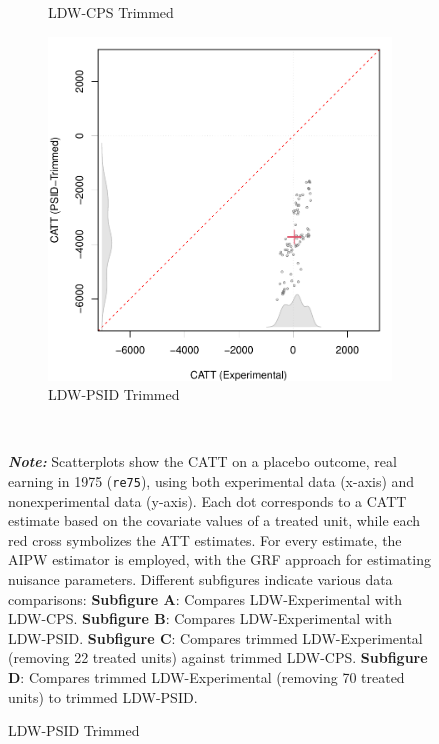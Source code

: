 \documentclass[letterpaper,12pt,leqno]{article}
\begin{document}
\begin{figure}[!ht]
\begin{minipage}[c]{1\textwidth}
\begin{subfigure}{0.4\linewidth}
            \caption{LDW-CPS Trimmed}
        \end{subfigure}
        \begin{subfigure}{0.4\linewidth}
            \includegraphics[width=\linewidth]{catt_placebo_PSID_trim.pdf}
            \caption{LDW-PSID Trimmed}
        \end{subfigure}
    \end{minipage}%
    \\\raggedright
     {\footnotesize\textbf{\textit{Note:}} Scatterplots show the CATT on a placebo outcome, real earning in 1975 (\texttt{re75}), using both experimental data (x-axis) and nonexperimental data (y-axis). Each dot corresponds to a CATT estimate based on the covariate values of a treated unit, while each red cross symbolizes the ATT estimates. For every estimate, the AIPW estimator is employed, with the GRF approach for estimating nuisance parameters. Different subfigures indicate various data comparisons: \textbf{Subfigure A}: Compares LDW-Experimental with LDW-CPS. \textbf{Subfigure B}: Compares LDW-Experimental with LDW-PSID. \textbf{Subfigure C}: Compares trimmed LDW-Experimental (removing 22 treated units) against trimmed LDW-CPS. \textbf{Subfigure D}: Compares trimmed LDW-Experimental (removing 70 treated units) to trimmed LDW-PSID.}
\end{figure}
\clearpage
\end{document}
